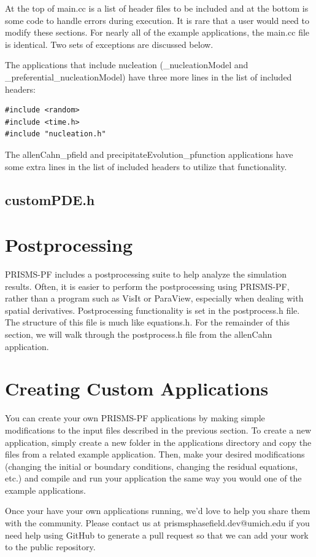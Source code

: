 \documentclass[10pt]{article} %
\begin{document}
 At the top of main.cc is a list of header files to be included and at the bottom is some code to handle errors during execution. It is rare that a user would need to modify these sections. For nearly all of the example applications, the main.cc file is identical. Two sets of exceptions are discussed below.
 
 The applications that include nucleation (\_nucleationModel and \_preferential\_nucleationModel) have three more lines in the list of included headers:
 \tiny
\begin{lstlisting} 
#include <random>
#include <time.h>
#include "nucleation.h"
\end{lstlisting}
 \normalsize
 
 The allenCahn\_pfield and precipitateEvolution\_pfunction applications have some extra lines in the list of included headers to utilize that functionality.
 
 \subsection{customPDE.h}

\section{Postprocessing} \label{postprocessing_sec}
PRISMS-PF includes a postprocessing suite to help analyze the simulation results. Often, it is easier to perform the postprocessing using PRISMS-PF, rather than a program such as VisIt or ParaView, especially when dealing with spatial derivatives. Postprocessing functionality is set in the postprocess.h file. The structure of this file is much like equations.h. For the remainder of this section, we will walk through the postprocess.h file from the allenCahn application.



\section{Creating Custom Applications}
You can create your own PRISMS-PF applications by making simple modifications to the input files described in the previous section. To create a new application, simply create a new folder in the applications directory and copy the files from a related example application. Then, make your desired modifications (changing the initial or boundary conditions, changing the residual equations, etc.) and compile and run your application the same way you would one of the example applications.

Once your have your own applications running, we'd love to help you share them with the community. Please contact us at prismsphasefield.dev@umich.edu if you need help using GitHub to generate a pull request so that we can add your work to the public repository.
\end{document}

